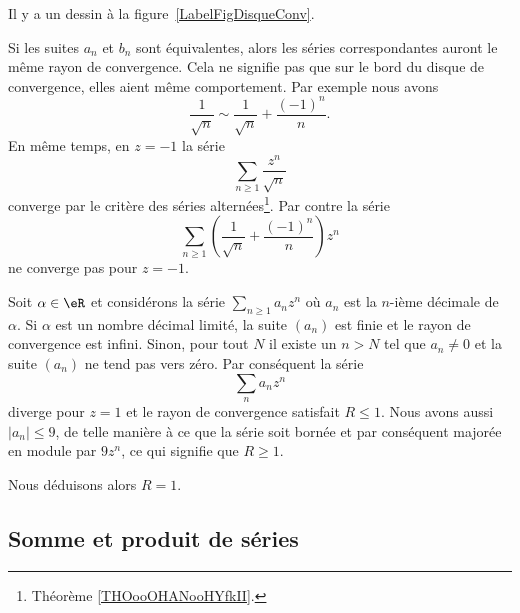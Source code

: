 Il y a un dessin à la figure~\ref{LabelFigDisqueConv}.
\newcommand{\CaptionFigDisqueConv}{À l'intérieur du disque de convergence, la convergence est absolue. En dehors, la série diverge. Sur le cercle proprement dit, tout peut arriver.}


Si les suites \( a_n\) et \( b_n\) sont équivalentes, alors les séries correspondantes auront le même rayon de convergence. Cela ne signifie pas que sur le bord du disque de convergence, elles aient même comportement. Par exemple nous avons
\begin{equation}
	\frac{1}{ \sqrt{n} }\sim \frac{1}{ \sqrt{n} }+\frac{ (-1)^n }{ n }.
\end{equation}
En même temps, en \( z=-1\) la série
\begin{equation}
	\sum_{n\geq 1}\frac{ z^n }{ \sqrt{n} }
\end{equation}
converge par le critère des séries alternées\footnote{Théorème \ref{THOooOHANooHYfkII}.}. Par contre la série
\begin{equation}
	\sum_{n\geq 1}\left( \frac{1}{ \sqrt{n} }+\frac{ (-1)^n }{ n } \right)z^n
\end{equation}
ne converge pas pour \( z=-1\).

\begin{example}
	Soit \( \alpha\in \eR\) et considérons la série \( \sum_{n\geq 1}a_nz^n\) où \( a_n\) est la \( n\)-ième décimale de \( \alpha\). Si \( \alpha\) est un nombre décimal limité, la suite \( (a_n)\) est finie et le rayon de convergence est infini. Sinon, pour tout \( N\) il existe un \( n>N\) tel que \( a_n\neq 0\) et la suite \( (a_n)\) ne tend pas vers zéro. Par conséquent la série
	\begin{equation}
		\sum_{n}a_nz^n
	\end{equation}
	diverge pour \( z=1\) et le rayon de convergence satisfait \( R\leq 1\). Nous avons aussi \( | a_n |\leq 9\), de telle manière à ce que la série soit bornée et par conséquent majorée en module par \( 9z^n\), ce qui signifie que \( R\geq 1\).

	Nous déduisons alors \( R=1\).
\end{example}

\subsection{Somme et produit de séries}

